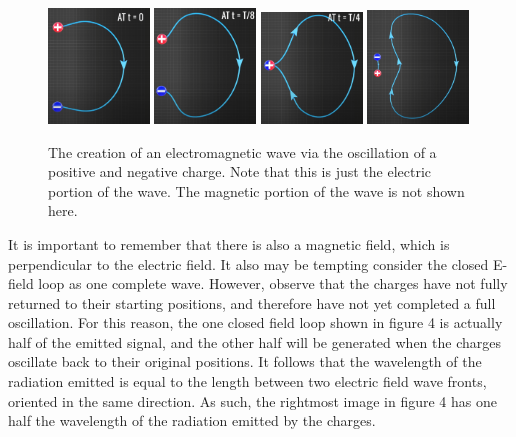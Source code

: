 \documentclass[12pt]{article}
\begin{document}
\begin{figure}[h]
    \centering
    \includegraphics[width=0.24\textwidth]{dipole-at-t0.png} 
    \includegraphics[width=0.24\textwidth]{dipole-at-t1.png}
    \includegraphics[width=0.24\textwidth]{dipole-at-t2.png}
    \includegraphics[width=0.24\textwidth]{dipole-at-t3.png}
    \caption{The creation of an electromagnetic wave via the oscillation of a positive and negative charge. Note that this is just the electric portion of the wave. The magnetic portion of the wave is not shown here.}
\end{figure}

It is important to remember that there is also a magnetic field, which is perpendicular to the electric field. It also may be tempting consider the closed E-field loop as one complete wave. However, observe that the charges have not fully returned to their starting positions, and therefore have not yet completed a full oscillation. For this reason, the one closed field loop shown in figure 4 is actually half of the emitted signal, and the other half will be generated when the charges oscillate back to their original positions. It follows that the wavelength of the radiation emitted is equal to the length between two electric field wave fronts, oriented in the same direction. As such, the rightmost image in figure 4 has one half the wavelength of the radiation emitted by the charges.
\end{document}
